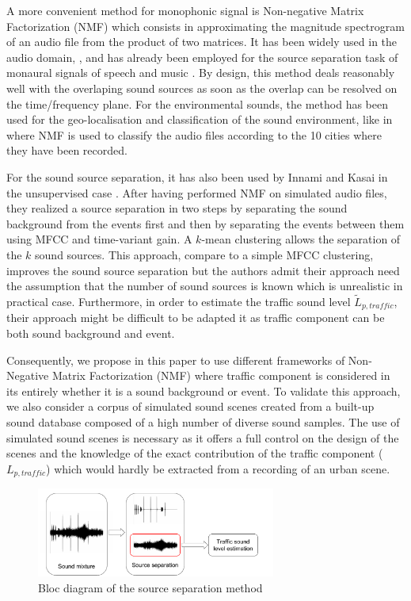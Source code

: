 \documentclass[twocolumn,a4paper,10pt]{article}
\begin{document}
A more convenient method for monophonic signal is Non-negative Matrix Factorization (NMF) \cite{lee_learning_1999} which consists in approximating the magnitude spectrogram of an audio file from the product of two matrices. It has been widely used in the audio domain, \cite{smaragdis_non-negative_2003} \cite{wilson_speech_2008} \cite{mesaros_sound_2015}, and has already been employed for the source separation task of monaural signals of speech and music \cite{wang_musical_2005} \cite{wilson_speech_2008}. By design, this method deals reasonably well with the overlaping sound sources as soon as the overlap can be resolved on the time/frequency plane. For the environmental sounds, the method has been used for the geo-localisation and classification of the sound environment, like in \cite{kumar_audio_2016} where NMF is used to classify the audio files according to the 10 cities where they have been recorded.

For the sound source separation, it has also been used by Innami and Kasai in the unsupervised case \cite{satoshi_innami_nmf-based_2012}. After having performed NMF on simulated audio files, they realized a source separation in two steps by separating the sound background from the events first and then by separating the events between them using MFCC and time-variant gain. A $k$-mean clustering allows the separation of the $k$ sound sources. This approach, compare to a simple MFCC clustering, improves the sound source separation but the authors admit their approach need the assumption that the number of sound sources is known which is unrealistic in practical case.  Furthermore, in order to estimate the traffic sound level $\tilde{L}_{p,traffic}$, their approach might be difficult to be adapted it as traffic component can be both sound background and event.

Consequently, we propose in this paper to use different frameworks of Non-Negative Matrix Factorization (NMF) where traffic component is considered in its entirely whether it is a sound background or event. To validate this approach, we also consider a corpus of simulated sound scenes created from a built-up sound database composed of a high number of diverse sound samples. The use of simulated sound scenes is necessary as it offers a full control on the design of the scenes and the knowledge of the exact contribution of the traffic component ($L_{p,traffic}$) which would hardly be extracted from a recording of an urban scene.

\begin{figure}[t]
\centering
\includegraphics[width=0.7\textwidth]{figures/bloc_diagram_source_separation.pdf}
\caption{Bloc diagram of the source separation method}
\end{figure}
\end{document}
